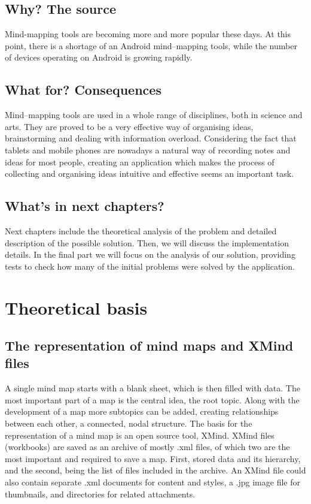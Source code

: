 \documentclass[american]{bsc}
\begin{document}
\section{Why? The source}
\label{sec:why}
Mind-mapping tools are becoming more and more popular these days. At this point, there is a shortage of an Android mind--mapping tools, while the number of devices operating on Android is growing rapidly. 

\section{What for? Consequences}
\label{sec:whatfor}
Mind--mapping tools are used in a whole range of disciplines, both in science and arts. They are proved to be a very effective way of organising ideas, brainstorming and dealing with information overload. Considering the fact that tablets and mobile phones are nowadays a natural way of recording notes and ideas for most people, creating an application which makes the process of collecting and organising ideas intuitive and effective seems an important task.

\section{What's in next chapters?}
\label{sec:nextchapters}
Next chapters include the theoretical analysis of the problem and detailed description of the possible solution. Then, we will discuss the implementation details. In the final part we will focus on the analysis of our solution, providing tests to check how many of the initial problems were solved by the application.

\chapter{Theoretical basis}
\label{chap:theory}

\section{The representation of mind maps and XMind files}
\label{sec:xmind}
A single mind map starts with a blank sheet, which is then filled with data. The most important part of a map is the central idea, the root topic.  Along with the development of a map more subtopics can be added, creating relationships between each other, a connected, nodal structure. The basis for the representation of a mind map is an open source tool, XMind. 
XMind files (workbooks) are saved as an archive of mostly .xml files, of which two are the most important and required to save a map. First,  stored data and its hierarchy, and the second,  being the list of files included in the archive. An XMind file could also contain separate .xml documents for content and styles, a .jpg image file for thumbnails, and directories for related attachments.
\end{document}
